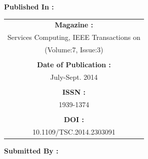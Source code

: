 \documentclass[a4paper,12pt]{article}
\begin{document}
     {\large\textbf{Published In :}}\\

    \begin{center}
        \begin{tabular}{c}
            \textbf{Magazine :}\\
            Services Computing, IEEE Transactions on\\
            (Volume:7, Issue:3)\\
            \\
            \textbf{Date of Publication :}\\
            July-Sept. 2014 \\
            \\
            \textbf{ISSN :}\\
            1939-1374\\
            \\
            \textbf{DOI :}\\
            10.1109/TSC.2014.2303091
        \end{tabular}

    \end{center}

    \newpage
    {\large\textbf{Submitted By :}}
\end{document}

